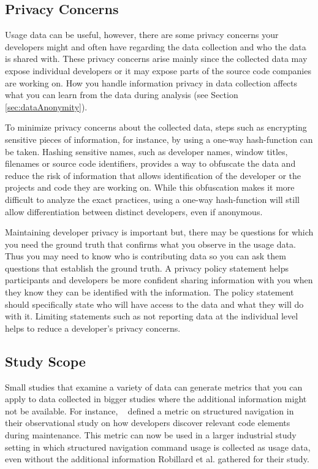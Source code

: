 \subsection{Privacy Concerns}

Usage data can be useful, however, there are some privacy concerns your developers might and often have regarding the data collection and who the data is shared with. These privacy concerns arise mainly since the collected data may expose individual developers or it may expose parts of the source code companies are working on.  How you handle information privacy in data collection affects what you can learn from the data during analysis (see Section \ref{sec:dataAnonymity}).

To minimize privacy concerns about the collected data, steps such as encrypting sensitive pieces of information, for instance, by using a one-way hash-function can be taken. Hashing sensitive names, such as developer names, window titles, filenames or source code identifiers, provides a way to obfuscate the data and reduce the risk of information that allows identification of the developer or the projects and code they are working on. While this obfuscation makes it more difficult to analyze the exact practices, using a one-way hash-function will still allow differentiation between distinct developers, even if anonymous.

Maintaining developer privacy is important but, there may be questions for which you need the ground truth that confirms what you observe in the usage data.  Thus you may need to know who is contributing data so you can ask them questions that establish the ground truth. A privacy policy statement helps participants and developers be more confident sharing information with you when they know they can be identified with the information.  The policy statement should specifically state who will have access to the data and what they will do with it. Limiting statements such as not reporting data at the individual level helps to reduce a developer's privacy concerns.

\subsection{Study Scope}

Small studies that examine a variety of data can generate metrics that you can apply to data collected in bigger studies where the additional information might not be available. 
        For instance, ~\citet{wbsnipes:Robillard2004How} defined a metric on structured navigation in their observational study on how developers discover relevant code elements during maintenance. This metric can now be used in a larger industrial study setting in which structured navigation command usage is collected as usage data, even without the additional information Robillard et al. gathered for their study.

